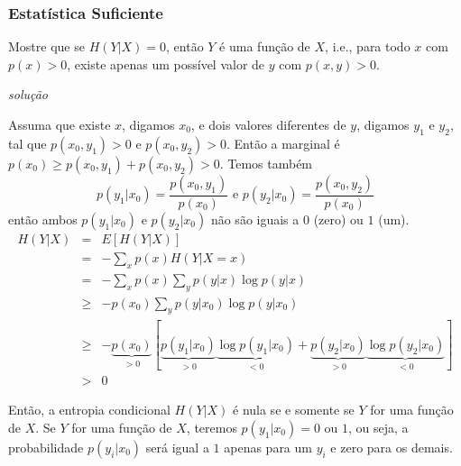 \begin{frame}[allowframebreaks]
  \frametitle{Estatística Suficiente}
  \begin{example}
  Mostre que se $H(Y|X)=0$, então $Y$ é uma função de $X$, i.e., para todo $x$ com $p(x)>0$,
  existe apenas um possível valor de $y$ com $p(x,y)>0$.

  \textit{solução}

  Assuma que existe $x$, digamos $x_0$, e dois valores diferentes de $y$, digamos $y_1$ e $y_2$,
  tal que $p(x_0,y_1) > 0$ e $p(x_0,y_2)>0$. Então a marginal é $p(x_0) \geq p(x_0,y_1) + p(x_0,y_2) > 0$.
  Temos também
  \begin{equation}
  p(y_1|x_0) = \frac{p(x_0,y_1)}{p(x_0)} \text{ e } p(y_2|x_0) = \frac{p(x_0,y_2)}{p(x_0)}
  \end{equation}
  então ambos $p(y_1|x_0)$ e $p(y_2|x_0)$ não são iguais a $0$ (zero) ou $1$ (um).
%
  \examplebreak
  \vspace{-0.7cm}
  \begin{eqnarray}
  H(Y|X) &=& E[H(Y|X)] \nonumber \\
        &=& - \sum_x p(x) H(Y|X=x) \nonumber \\
        &=& - \sum_x p(x) \sum_y p(y|x) \log p(y|x) \nonumber \\
        &\geq& - p(x_0) \sum_y p(y|x_0) \log p(y|x_0) \nonumber \\
        &\geq& - \underbrace{p(x_0)}_{>0} [ \underbrace{p(y_1|x_0)}_{>0} \underbrace{\log p(y_1|x_0)}_{<0} + \underbrace{p(y_2|x_0)}_{>0} \underbrace{\log p(y_2|x_0)}_{<0} ] \nonumber \\
        &>& 0
  \end{eqnarray}

  \examplebreak

  Então, a entropia condicional $H(Y|X)$ é nula se e somente se $Y$ for uma função de $X$.
  Se $Y$ for uma função de $X$, teremos $p(y_1|x_0) = 0 \text{ ou } 1$, ou seja, a probabilidade
  $p(y_i|x_0)$ será igual a $1$ apenas para um $y_i$ e zero para os demais.

  \end{example}
\end{frame}




